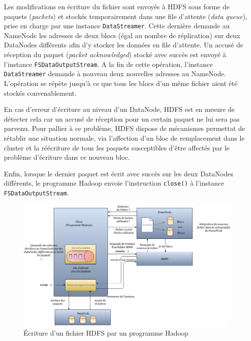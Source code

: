 \par Les modifications en écriture du fichier sont envoyés à HDFS sous forme de paquets (\textit{packets}) et stockés temporairement dans une file d'attente (\textit{data queue}), prise en charge par une instance \texttt{DataStreamer}. Cette dernière demande au NameNode les adresses de deux blocs (égal au nombre de réplication) sur deux DataNodes différents afin d'y stocker les données en file d'attente. Un accusé de réception du paquet (\textit{packet acknowledged}) stocké avec succès est envoyé à l'instance \texttt{FSDataOutputStream}. A la fin de cette opération, l'instance \texttt{DataStreamer} demande à nouveau deux nouvelles adresses au NameNode. L'opération se répète jusqu'à ce que tous les blocs d'un même fichier aient été stockés convenablement.

\par En cas d'erreur d'écriture au niveau d'un DataNode, HDFS est en mesure de détecter cela car un accusé de réception pour un certain paquet ne lui sera pas parvenu. Pour pallier à ce problème, HDFS dispose de mécanismes permettat de rétablir une situation normale, via l'affection d'un bloc de remplacement dans le cluster et la réécriture de tous les paquets susceptibles d'être affectés par le problème d'écriture dans ce nouveau bloc.

\par Enfin, lorsque le dernier paquet est écrit avec succès sur les deux DataNodes différents, le programme Hadoop envoie l'instruction \texttt{close()} à l'instance \texttt{FSDataOutputStream}.

\begin{figure}[h!]
  \centering
  \includegraphics[width=17cm]{images/writing_file.png}
  \caption{\'{E}criture d'un fichier HDFS par un programme Hadoop}
  \label{fig:ecriture-hdfs}
\end{figure}

